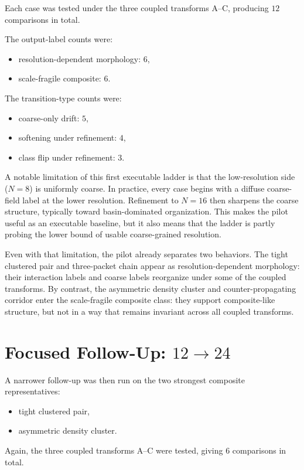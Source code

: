 \documentclass[11pt]{article}
\begin{document}
Each case was tested under the three coupled transforms A--C, producing $12$ comparisons in total.

The output-label counts were:
\begin{itemize}
\item resolution-dependent morphology: $6$,
\item scale-fragile composite: $6$.
\end{itemize}

The transition-type counts were:
\begin{itemize}
\item coarse-only drift: $5$,
\item softening under refinement: $4$,
\item class flip under refinement: $3$.
\end{itemize}

A notable limitation of this first executable ladder is that the low-resolution side ($N=8$) is uniformly coarse. In practice, every case begins with a diffuse coarse-field label at the lower resolution. Refinement to $N=16$ then sharpens the coarse structure, typically toward basin-dominated organization. This makes the pilot useful as an executable baseline, but it also means that the ladder is partly probing the lower bound of usable coarse-grained resolution.

Even with that limitation, the pilot already separates two behaviors. The tight clustered pair and three-packet chain appear as resolution-dependent morphology: their interaction labels and coarse labels reorganize under some of the coupled transforms. By contrast, the asymmetric density cluster and counter-propagating corridor enter the scale-fragile composite class: they support composite-like structure, but not in a way that remains invariant across all coupled transforms.

\section{Focused Follow-Up: \(12 \rightarrow 24\)}

A narrower follow-up was then run on the two strongest composite representatives:
\begin{itemize}
\item tight clustered pair,
\item asymmetric density cluster.
\end{itemize}

Again, the three coupled transforms A--C were tested, giving $6$ comparisons in total.
\end{document}
